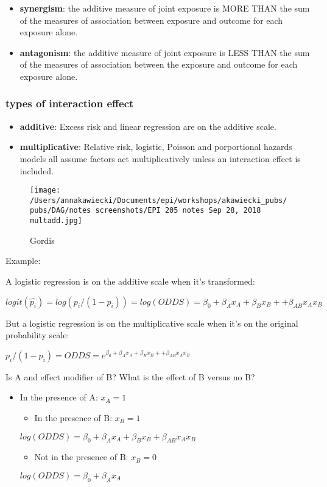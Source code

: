 \documentclass[
]{article}
\providecommand{\tightlist}{%
  \setlength{\itemsep}{0pt}\setlength{\parskip}{0pt}}
\begin{document}
\begin{itemize}
\item
  \textbf{synergism}: the additive measure of joint exposure is MORE
  THAN the sum of the measures of association between exposure and
  outcome for each exposure alone.
\item
  \textbf{antagonism}: the additive measure of joint exposure is LESS
  THAN the sum of the measures of association between the exposure and
  outcome for each exposure alone.
\end{itemize}

\hypertarget{types-of-interaction-effect}{%
\subsubsection{types of interaction
effect}\label{types-of-interaction-effect}}

\begin{itemize}
\item
  \textbf{additive}: Excess risk and linear regression are on the
  additive scale.
\item
  \textbf{multiplicative}: Relative risk, logistic, Poisson and
  porportional hazards models all assume factors act multiplicatively
  unless an interaction effect is included.
\end{itemize}

\begin{figure}
\centering
\texttt{[image: /Users/annakawiecki/Documents/epi/workshops/akawiecki\_pubs/pubs/DAG/notes screenshots/EPI 205 notes Sep 28, 2018 multadd.jpg]}
\caption{Gordis}
\end{figure}

Example:

A logistic regression is on the additive scale when it's transformed:

\(logit(\hat{p_i}) = log(p_i/(1-p_i)) = log(ODDS) =\beta_0 +\beta_A x_A + \beta_B x_B + +\beta_{AB} x_A x_B\)

But a logistic regression is on the multiplicative scale when it's on
the original probability scale:

\(p_i/(1-p_i) = ODDS =e^{\beta_0 +\beta_A x_A + \beta_B x_B + +\beta_{AB} x_A x_B}\)

Is A and effect modifier of B? What is the effect of B versus no B?

\begin{itemize}
\item
  In the presence of A: \(x_A = 1\)

  \begin{itemize}
  \tightlist
  \item
    In the presence of B: \(x_B = 1\)
  \end{itemize}

  \(log(ODDS) =\beta_0 +\beta_A x_A + \beta_B x_B + \beta_{AB} x_A x_B\)

  \begin{itemize}
  \tightlist
  \item
    Not in the presence of B: \(x_B = 0\)
  \end{itemize}

  \(log(ODDS) =\beta_0 +\beta_A x_A\)
\end{itemize}
\end{document}
